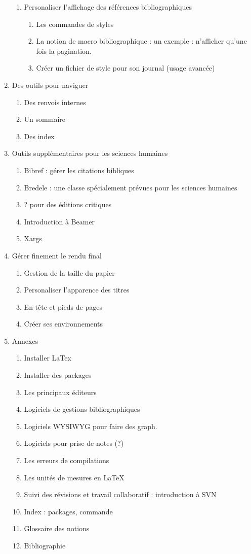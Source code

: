\begin{enumerate}
\begin{enumerate}
\item Personaliser l'affichage des références bibliographiques
	\begin{enumerate}
	\item Les commandes de styles
	\item La notion de macro bibliographique : un exemple : n'afficher qu'une fois la pagination.
	\item Créer un fichier de style pour son journal (usage avancée)
	\end{enumerate}	
\end{enumerate}

\item Des outils pour naviguer
\begin{enumerate}
\item Des renvois internes
\item Un sommaire
\item Des index
\end{enumerate}

\item Outils supplémentaires pour les sciences humaines
\begin{enumerate}
\item Bibref : gérer les citations bibliques
\item Bredele : une classe spécialement prévues pour les sciences humaines
\item ? pour des éditions critiques
\item Introduction à Beamer
\item Xargs
\end{enumerate}

\item Gérer finement le rendu final
\begin{enumerate}
\item Gestion de la taille du papier
\item Personaliser l'apparence des titres
\item En-tête et pieds de pages
\item Créer ses environnements
\end{enumerate}

\item{Annexes}
\begin{enumerate}
\item Installer LaTex
\item Installer des packages
\item Les principaux éditeurs
\item Logiciels de gestions bibliographiques
\item Logiciels WYSIWYG pour faire des graph.
\item Logiciels pour prise de notes (?)
\item Les erreurs de compilations
\item Les unités de mesures en LaTeX
\item Suivi des révisions et travail collaboratif : introduction à SVN
\item Index : packages, commande
\item Glossaire des notions
\item Bibliographie
\end{enumerate}
\end{enumerate}